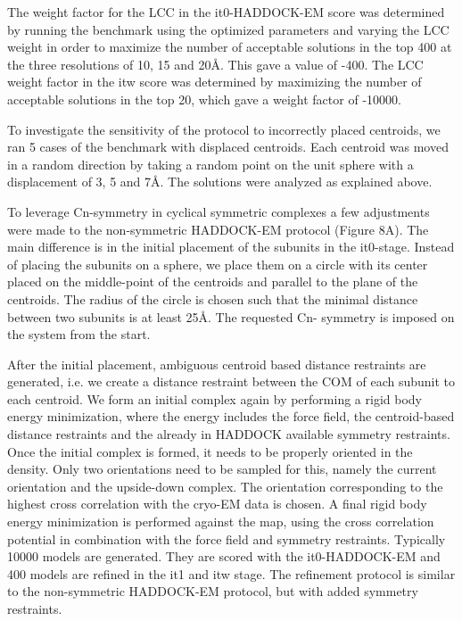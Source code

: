 The weight factor for the LCC in the it0-HADDOCK-EM score was determined by
running the benchmark using the optimized parameters and varying the LCC weight
in order to maximize the number of acceptable solutions in the top 400 at the
three resolutions of 10, 15 and 20Å. This gave a value of -400.  The LCC weight
factor in the itw score was determined by maximizing the number of acceptable
solutions in the top 20, which gave a weight factor of -10000.

To investigate the sensitivity of the protocol to incorrectly placed centroids,
we ran 5 cases of the benchmark with displaced centroids.  Each centroid was
moved in a random direction by taking a random point on the unit sphere with a
displacement of 3, 5 and 7Å.  The solutions were analyzed as explained above.


To leverage Cn-symmetry in cyclical symmetric complexes a few adjustments were
made to the non-symmetric HADDOCK-EM protocol (Figure 8A).  The main difference
is in the initial placement of the subunits in the it0-stage.  Instead of
placing the subunits on a sphere, we place them on a circle with its center
placed on the middle-point of the centroids and parallel to the plane of the
centroids.  The radius of the circle is chosen such that the minimal distance
between two subunits is at least 25Å.  The requested Cn- symmetry is imposed on
the system from the start. 

After the initial placement, ambiguous centroid based distance restraints are
generated, i.e. we create a distance restraint between the COM of each subunit
to each centroid.  We form an initial complex again by performing a rigid body
energy minimization, where the energy includes the force field, the
centroid-based distance restraints and the already in HADDOCK available
symmetry restraints.  Once the initial complex is formed, it needs to be
properly oriented in the density.  Only two orientations need to be sampled for
this, namely the current orientation and the upside-down complex.  The
orientation corresponding to the highest cross correlation with the cryo-EM
data is chosen.  A final rigid body energy minimization is performed against
the map, using the cross correlation potential in combination with the force
field and symmetry restraints.  Typically 10000 models are generated.  They are
scored with the it0-HADDOCK-EM and 400 models are refined in the it1 and itw
stage.  The refinement protocol is similar to the non-symmetric HADDOCK-EM
protocol, but with added symmetry restraints.

